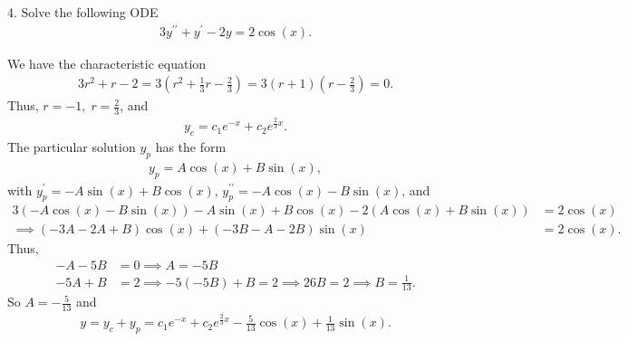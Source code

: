 \documentclass{report}
\begin{document}
    \bigbreak \noindent 
    \begin{mdframed}
        4. Solve the following ODE
        \begin{align*}
            3y^{\prime\prime} + y^{\prime} - 2y = 2\cos{\left(x\right)}
        .\end{align*}
    \end{mdframed}
    \bigbreak \noindent 
    We have the characteristic equation
    \begin{align*}
        3r^{2} + r - 2 = 3\left(r^{2}+\frac{1}{3}r - \frac{2}{3}\right) = 3\left(r+1\right)\left(r-\frac{2}{3}\right) = 0
    .\end{align*}
    Thus, $r=-1,\; r=\frac{2}{3}$, and
    \begin{align*}
        y_{c} = c_{1}e^{-x} + c_{2}e^{\frac{2}{3}x}
    .\end{align*}
    The particular solution $y_{p}$ has the form
    \begin{align*}
        y_{p} = A\cos{\left(x\right)} + B\sin{\left(x\right)}
    ,\end{align*}
    with $y_{p}^{\prime} = -A\sin{\left(x\right)} + B\cos{\left(x\right)} $, $y^{\prime\prime}_{p} = -A\cos{\left(x\right)} -B\sin{\left(x\right)}$, and 
    \begin{align*}
        3\left(-A\cos{\left(x\right)} - B\sin{\left(x\right)}\right) -A\sin{\left(x\right)} + B\cos{\left(x\right)} - 2\left(A\cos{\left(x\right)} + B\sin{\left(x\right)}\right) &= 2\cos{\left(x\right)} \\
        \implies (-3A-2A+B)\cos{\left(x\right)} + (-3B-A-2B)\sin{\left(x\right)} &= 2\cos{\left(x\right)}
    .\end{align*}
    Thus,
    \begin{align*}
        -A-5B &= 0 \implies A = -5B \\
        -5A+B &= 2  \implies -5(-5B) + B = 2 \implies 26B = 2 \implies B = \frac{1}{13}
    .\end{align*}
    So $A = -\frac{5}{13}$ and
    \begin{align*}
        y = y_{c} + y_{p} = c_{1}e^{-x} + c_{2}e^{\frac{2}{3}x} -\frac{5}{13}\cos{\left(x\right)} + \frac{1}{13}\sin{\left(x\right)}
    .\end{align*}
\end{document}
